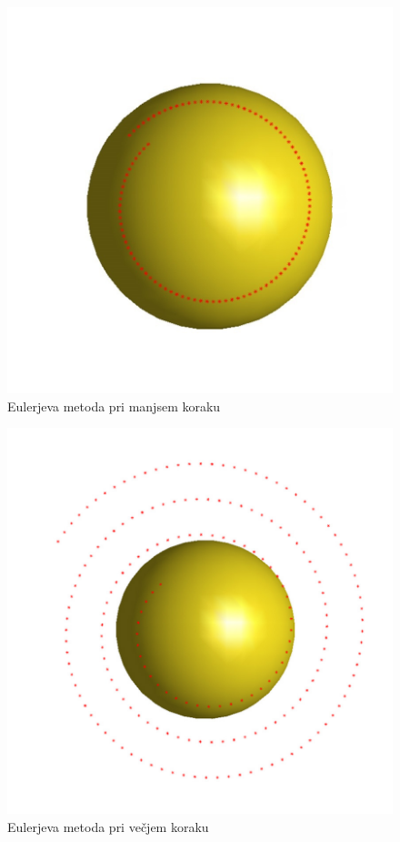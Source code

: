 \documentclass[12pt]{article}
\begin{document}
	\begin{figure}[H]
	    \centering
    	\includegraphics[scale=0.30]{eul1}
    	\caption{Eulerjeva metoda pri manjsem koraku}
    	\label{slika:eul1}
	\end{figure}
	\begin{figure}[H]
	    \centering
    	\includegraphics[scale=0.30]{eul2}
    	\caption{Eulerjeva metoda pri večjem koraku}
    	\label{slika:eul2}
	\end{figure}
\end{document}
